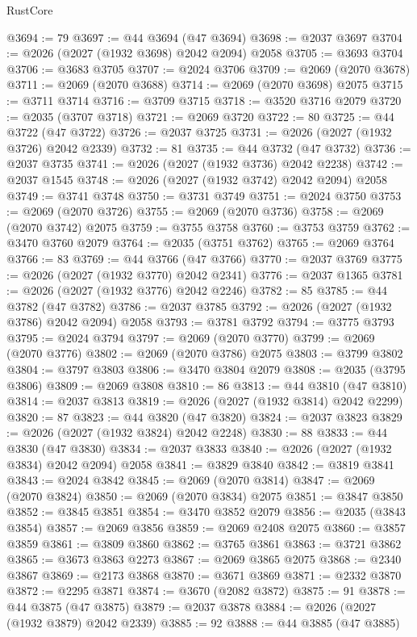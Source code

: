 \begin{lexlean}{RustCore}
\begin{coremodule}
@3694 := 79
@3697 := @44 @3694 (@47 @3694)
@3698 := @2037 @3697
@3704 := @2026 (@2027 (@1932 @3698) @2042 @2094) @2058
@3705 := @3693 @3704
@3706 := @3683 @3705
@3707 := @2024 @3706
@3709 := @2069 (@2070 @3678)
@3711 := @2069 (@2070 @3688)
@3714 := @2069 (@2070 @3698) @2075
@3715 := @3711 @3714
@3716 := @3709 @3715
@3718 := @3520 @3716 @2079
@3720 := @2035 (@3707 @3718)
@3721 := @2069 @3720
@3722 := 80
@3725 := @44 @3722 (@47 @3722)
@3726 := @2037 @3725
@3731 := @2026 (@2027 (@1932 @3726) @2042 @2339)
@3732 := 81
@3735 := @44 @3732 (@47 @3732)
@3736 := @2037 @3735
@3741 := @2026 (@2027 (@1932 @3736) @2042 @2238)
@3742 := @2037 @1545
@3748 := @2026 (@2027 (@1932 @3742) @2042 @2094) @2058
@3749 := @3741 @3748
@3750 := @3731 @3749
@3751 := @2024 @3750
@3753 := @2069 (@2070 @3726)
@3755 := @2069 (@2070 @3736)
@3758 := @2069 (@2070 @3742) @2075
@3759 := @3755 @3758
@3760 := @3753 @3759
@3762 := @3470 @3760 @2079
@3764 := @2035 (@3751 @3762)
@3765 := @2069 @3764
@3766 := 83
@3769 := @44 @3766 (@47 @3766)
@3770 := @2037 @3769
@3775 := @2026 (@2027 (@1932 @3770) @2042 @2341)
@3776 := @2037 @1365
@3781 := @2026 (@2027 (@1932 @3776) @2042 @2246)
@3782 := 85
@3785 := @44 @3782 (@47 @3782)
@3786 := @2037 @3785
@3792 := @2026 (@2027 (@1932 @3786) @2042 @2094) @2058
@3793 := @3781 @3792
@3794 := @3775 @3793
@3795 := @2024 @3794
@3797 := @2069 (@2070 @3770)
@3799 := @2069 (@2070 @3776)
@3802 := @2069 (@2070 @3786) @2075
@3803 := @3799 @3802
@3804 := @3797 @3803
@3806 := @3470 @3804 @2079
@3808 := @2035 (@3795 @3806)
@3809 := @2069 @3808
@3810 := 86
@3813 := @44 @3810 (@47 @3810)
@3814 := @2037 @3813
@3819 := @2026 (@2027 (@1932 @3814) @2042 @2299)
@3820 := 87
@3823 := @44 @3820 (@47 @3820)
@3824 := @2037 @3823
@3829 := @2026 (@2027 (@1932 @3824) @2042 @2248)
@3830 := 88
@3833 := @44 @3830 (@47 @3830)
@3834 := @2037 @3833
@3840 := @2026 (@2027 (@1932 @3834) @2042 @2094) @2058
@3841 := @3829 @3840
@3842 := @3819 @3841
@3843 := @2024 @3842
@3845 := @2069 (@2070 @3814)
@3847 := @2069 (@2070 @3824)
@3850 := @2069 (@2070 @3834) @2075
@3851 := @3847 @3850
@3852 := @3845 @3851
@3854 := @3470 @3852 @2079
@3856 := @2035 (@3843 @3854)
@3857 := @2069 @3856
@3859 := @2069 @2408 @2075
@3860 := @3857 @3859
@3861 := @3809 @3860
@3862 := @3765 @3861
@3863 := @3721 @3862
@3865 := @3673 @3863 @2273
@3867 := @2069 @3865 @2075
@3868 := @2340 @3867
@3869 := @2173 @3868
@3870 := @3671 @3869
@3871 := @2332 @3870
@3872 := @2295 @3871
@3874 := @3670 (@2082 @3872)
@3875 := 91
@3878 := @44 @3875 (@47 @3875)
@3879 := @2037 @3878
@3884 := @2026 (@2027 (@1932 @3879) @2042 @2339)
@3885 := 92
@3888 := @44 @3885 (@47 @3885)

\end{coremodule}
\end{lexlean}
